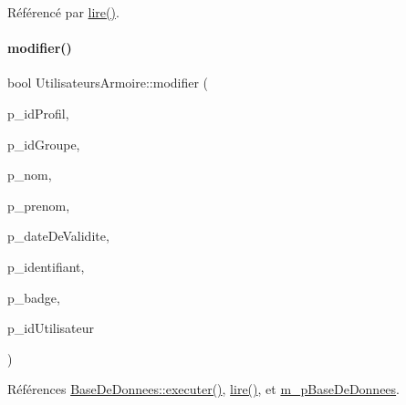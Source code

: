 Référencé par \hyperlink{class_utilisateurs_armoire_a10b2038874606c0afccf0f18c038dd0c}{lire()}.

\mbox{\label{class_utilisateurs_armoire_affd91d7591d57b8dafc098f09b9319aa}} 
\paragraph{\texorpdfstring{modifier()}{modifier()}}
{\footnotesize\ttfamily bool Utilisateurs\+Armoire\+::modifier (\begin{DoxyParamCaption}\item[{Q\+String}]{p\+\_\+id\+Profil,  }\item[{Q\+String}]{p\+\_\+id\+Groupe,  }\item[{Q\+String}]{p\+\_\+nom,  }\item[{Q\+String}]{p\+\_\+prenom,  }\item[{Q\+String}]{p\+\_\+date\+De\+Validite,  }\item[{Q\+String}]{p\+\_\+identifiant,  }\item[{Q\+String}]{p\+\_\+badge,  }\item[{Q\+String}]{p\+\_\+id\+Utilisateur }\end{DoxyParamCaption})}



Références \hyperlink{class_base_de_donnees_aa8de5f8f8bb17edc43f5c0ee33712081}{Base\+De\+Donnees\+::executer()}, \hyperlink{class_utilisateurs_armoire_a10b2038874606c0afccf0f18c038dd0c}{lire()}, et \hyperlink{class_utilisateurs_armoire_ac43b4894f5036117d044ad2d22b09318}{m\+\_\+p\+Base\+De\+Donnees}.


